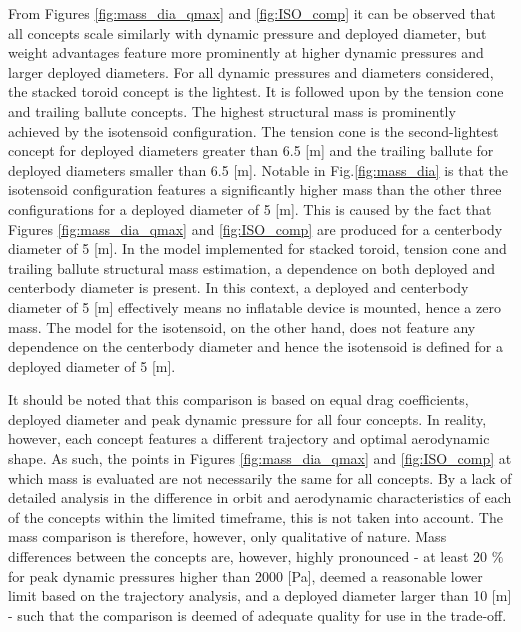 From Figures \ref{fig:mass_dia_qmax} and \ref{fig:ISO_comp} it can be observed that all concepts scale similarly with dynamic pressure and deployed diameter, but weight advantages feature more prominently at higher dynamic pressures and larger deployed diameters. For all dynamic pressures and diameters considered, the stacked toroid concept is the lightest. It is followed upon by the tension cone and trailing ballute concepts. The highest structural mass is prominently achieved by the isotensoid configuration. The tension cone is the second-lightest concept for deployed diameters greater than 6.5 [m] and the trailing ballute for deployed diameters smaller than 6.5 [m]. Notable in Fig.\ref{fig:mass_dia} is that the isotensoid configuration features a significantly higher mass than the other three configurations for a deployed diameter of 5 [m]. This is caused by the fact that Figures \ref{fig:mass_dia_qmax} and \ref{fig:ISO_comp} are produced for a centerbody diameter of 5 [m]. In the model implemented for stacked toroid, tension cone and trailing ballute \cite{Samareh2011} structural mass estimation, a dependence on both deployed and centerbody diameter is present. In this context, a deployed and centerbody diameter of 5 [m] effectively means no inflatable device is mounted, hence a zero mass. The model for the isotensoid, on the other hand, \cite{Anderson1969} does not feature any dependence on the centerbody diameter and hence the isotensoid is defined for a deployed diameter of 5 [m].

It should be noted that this comparison is based on equal drag coefficients, deployed diameter and peak dynamic pressure for all four concepts. In reality, however, each concept features a different trajectory and optimal aerodynamic shape. As such, the points in Figures \ref{fig:mass_dia_qmax} and \ref{fig:ISO_comp} at which mass is evaluated are not necessarily the same for all concepts. By a lack of detailed analysis in the difference in orbit and aerodynamic characteristics of each of the concepts within the limited timeframe, this is not taken into account. The mass comparison is therefore, however, only qualitative of nature. Mass differences between the concepts are, however, highly pronounced - at least 20 $\%$ for peak dynamic pressures higher than 2000 [Pa], deemed a reasonable lower limit based on the trajectory analysis, and a deployed diameter larger than 10 [m] - such that the comparison is deemed of adequate quality for use in the trade-off.


